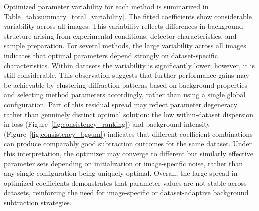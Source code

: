 \documentclass[iucr]{iucrjournals}
\begin{document}
Optimized parameter variability for each method is summarized in Table~\ref{tab:summary_total_variability}. The fitted coefficients show considerable variability across all images. This variability reflects differences in background structure arising from experimental conditions, detector characteristics, and sample preparation. For several methods, the large variability across all images indicates that optimal parameters depend strongly on dataset-specific characteristics. Within datasets the variability is significantly lower; however, it is still considerable. This observation suggests that further performance gains may be achievable by clustering diffraction patterns based on background properties and selecting method parameters accordingly, rather than using a single global configuration. Part of this residual spread may reflect parameter degeneracy rather than genuinely distinct optimal solution: the low within-dataset dispersion in loss (Figure~\ref{fig:consistency_ranking}) and background intensity (Figure~\ref{fig:consistency_bgsum}) indicates that different coefficient combinations can produce comparably good subtraction outcomes for the same dataset. Under this interpretation, the optimizer may converge to different but similarly effective parameter sets depending on initialization or image-specific noise, rather than any single configuration being uniquely optimal. Overall, the large spread in optimized coefficients demonstrates that parameter values are not stable across datasets, reinforcing the need for image-specific or dataset-adaptive background subtraction strategies.
\end{document}
